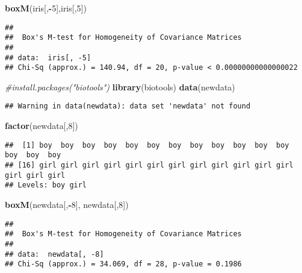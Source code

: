 \documentclass[]{article}
\newenvironment{Shaded}{\begin{snugshade}}{\end{snugshade}}
\newcommand{\KeywordTok}[1]{\textcolor[rgb]{0.13,0.29,0.53}{\textbf{#1}}}
\newcommand{\DecValTok}[1]{\textcolor[rgb]{0.00,0.00,0.81}{#1}}
\newcommand{\CommentTok}[1]{\textcolor[rgb]{0.56,0.35,0.01}{\textit{#1}}}
\newcommand{\OperatorTok}[1]{\textcolor[rgb]{0.81,0.36,0.00}{\textbf{#1}}}
\newcommand{\NormalTok}[1]{#1}
\begin{document}
\begin{Shaded}
\begin{Highlighting}[]
\KeywordTok{boxM}\NormalTok{(iris[,}\OperatorTok{-}\DecValTok{5}\NormalTok{],iris[,}\DecValTok{5}\NormalTok{])}
\end{Highlighting}
\end{Shaded}

\begin{verbatim}
## 
##  Box's M-test for Homogeneity of Covariance Matrices
## 
## data:  iris[, -5]
## Chi-Sq (approx.) = 140.94, df = 20, p-value < 0.00000000000000022
\end{verbatim}

\begin{Shaded}
\begin{Highlighting}[]
\CommentTok{#install.packages("biotools")}
\KeywordTok{library}\NormalTok{(biotools)}
\KeywordTok{data}\NormalTok{(newdata)}
\end{Highlighting}
\end{Shaded}

\begin{verbatim}
## Warning in data(newdata): data set 'newdata' not found
\end{verbatim}

\begin{Shaded}
\begin{Highlighting}[]
\KeywordTok{factor}\NormalTok{(newdata[,}\DecValTok{8}\NormalTok{])}
\end{Highlighting}
\end{Shaded}

\begin{verbatim}
##  [1] boy  boy  boy  boy  boy  boy  boy  boy  boy  boy  boy  boy  boy  boy  boy 
## [16] girl girl girl girl girl girl girl girl girl girl girl girl girl girl girl
## Levels: boy girl
\end{verbatim}

\begin{Shaded}
\begin{Highlighting}[]
\KeywordTok{boxM}\NormalTok{(newdata[,}\OperatorTok{-}\DecValTok{8}\NormalTok{], newdata[,}\DecValTok{8}\NormalTok{])}
\end{Highlighting}
\end{Shaded}

\begin{verbatim}
## 
##  Box's M-test for Homogeneity of Covariance Matrices
## 
## data:  newdata[, -8]
## Chi-Sq (approx.) = 34.069, df = 28, p-value = 0.1986
\end{verbatim}
\end{document}

